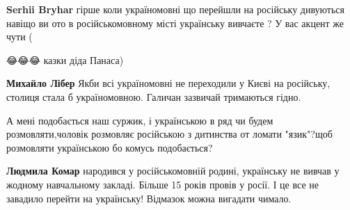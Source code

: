 \begin{itemize}
\begin{itemize}
 
\textbf{Serhii Bryhar} гірше коли україномовні що перейшли на російську
дивуються навіщо ви ото в російськомовному місті українську вивчаєте ? У вас
акцент же чути (

 
😂😂😂 казки діда Панаса)

 
\textbf{Михайло Лібер} Якби всі україномовні не переходили у Києві на російську, столиця стала б україномовною. Галичан зазвичай тримаються гідно.
\end{itemize}

 

А мені подобається наш суржик, і українською в ряд чи будем розмовляти,чоловік
розмовляє російською з дитинства от ломати "язик"?щоб розмовляти українською бо
комусь подобається?

\begin{itemize}
 
\textbf{Людмила Комар} народився у російськомовній родині, українську не вивчав у жодному навчальному закладі. Більше 15 років провів у росії. І це все не завадило перейти на українську! Відмазок можна вигадати чимало.

 

\end{itemize}
\end{itemize}
